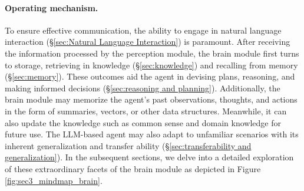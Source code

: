 \paragraph{Operating mechanism.}
To ensure effective communication, the ability to engage in natural language interaction (\S \ref{sec:Natural Language Interaction}) is paramount. After receiving the information processed by the perception module, the brain module first turns to storage, retrieving in knowledge (\S \ref{sec:knowledge}) and recalling from memory (\S \ref{sec:memory}). These outcomes aid the agent in devising plans, reasoning, and making informed decisions (\S \ref{sec:reasoning and planning}). Additionally, the brain module may memorize the agent's past observations, thoughts, and actions in the form of summaries, vectors, or other data structures. Meanwhile, it can also update the knowledge such as common sense and domain knowledge for future use. 
The LLM-based agent may also adapt to unfamiliar scenarios with its inherent generalization and transfer ability (\S \ref{sec:transferability and generalization}). 
In the subsequent sections, we delve into a detailed exploration of these extraordinary facets of the brain module as depicted in Figure \ref{fig:sec3_mindmap_brain}. 

